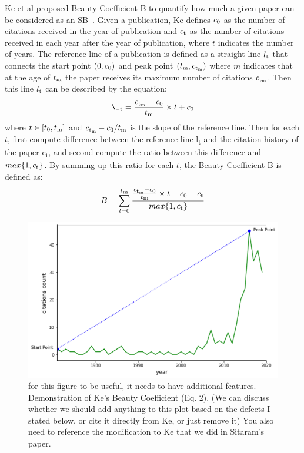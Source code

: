 \documentclass[utf8]{frontiersSCNS}
\begin{document}
{Ke et al proposed Beauty Coefficient B to quantify how much a given paper can be considered as an SB~\citep{Ke2015}. Given a publication, Ke defines $c\textsubscript{0}$ as the number of citations received in the year of publication and $c\textsubscript{t}$ as the number of citations received in each year after the year of publication, where $t$ indicates the number of years. The reference line of a publication is defined as a straight line $l\textsubscript{t}$ that connects the start point $(0, c\textsubscript{0})$ and peak point $(t\textsubscript{m}, c\textsubscript{t\textsubscript{m}})$ where $m$ indicates that at the age of $t\textsubscript{m}$ the paper receives its maximum number of citations $c\textsubscript{t\textsubscript{m}}$. Then this line $l\textsubscript{t}$ can be described by the equation:
\begin{equation}
\l\textsubscript{t} = \frac{c\textsubscript{t\textsubscript{m}} - c\textsubscript{0}}{t\textsubscript{m}} \times t + c\textsubscript{0}
\end{equation}
where $t \in [t\textsubscript{0}, t\textsubscript{m}]$ and ${c\textsubscript{t\textsubscript{m}} - c\textsubscript{0}}/{t\textsubscript{m}}$ is the slope of the reference line. Then for each $t$, first compute difference between the reference line l\textsubscript{t} and the citation history of the paper c\textsubscript{t}, and second compute the ratio between this difference and $max\{1, c\textsubscript{t}\}$. By summing up this ratio for each $t$, the Beauty Coefficient B is defined as:
\begin{equation}
B = \sum_{t = 0}^{t\textsubscript{m}} \frac{\frac{c\textsubscript{t\textsubscript{m}} - c\textsubscript{0}}{t\textsubscript{m}} \times t + c\textsubscript{0} - c\textsubscript{t}}{max\{1, c\textsubscript{t}\}}
\end{equation}

\begin{figure}
\begin{center}
\includegraphics{Picture1}
\caption{for this figure to be useful, it needs to have additional features. Demonstration of Ke's Beauty Coefficient (Eq. 2). (We can discuss whether we should add anything to this plot based on the defects I stated below, or cite it directly from Ke, or just remove it) You also need to reference the modification to Ke that we did in Sitaram's paper.}
\label{fig:1} 
\end{center}
\end{figure}

}
\end{document}
